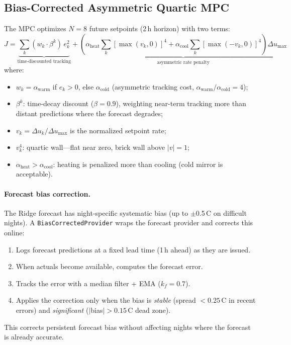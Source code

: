\documentclass[11pt]{article}
\begin{document}
\subsection{Bias-Corrected Asymmetric Quartic MPC}

The MPC optimizes $N = 8$ future setpoints (2\,h horizon) with two terms:
\begin{equation}
  J = \underbrace{\sum_{k} (w_k \cdot \beta^k) \, e_k^2}_{\text{time-discounted tracking}}
    + \underbrace{\left( \alpha_\mathrm{heat} \sum_{k} [\max(v_k, 0)]^4
           + \alpha_\mathrm{cool} \sum_{k} [\max(-v_k, 0)]^4 \right) \Delta u_\mathrm{max}}_{\text{asymmetric rate penalty}}
\end{equation}
where:
\begin{itemize}
  \item $w_k = \alpha_\mathrm{warm}$ if $e_k > 0$, else $\alpha_\mathrm{cold}$
    (asymmetric tracking cost, $\alpha_\mathrm{warm}/\alpha_\mathrm{cold} = 4$);
  \item $\beta^k$: time-decay discount ($\beta = 0.9$), weighting near-term
    tracking more than distant predictions where the forecast degrades;
  \item $v_k = \Delta u_k / \Delta u_\mathrm{max}$ is the normalized setpoint rate;
  \item $v_k^4$: quartic wall---flat near zero, brick wall above $|v| = 1$;
  \item $\alpha_\mathrm{heat} > \alpha_\mathrm{cool}$: heating is penalized more
    than cooling (cold mirror is acceptable).
\end{itemize}

\paragraph{Forecast bias correction.}
The Ridge forecast has night-specific systematic bias (up to
$\pm$0.5\,\textdegree C on difficult nights).  A \texttt{BiasCorrectedProvider}
wraps the forecast provider and corrects this online:
\begin{enumerate}
  \item Logs forecast predictions at a fixed lead time (1\,h ahead) as they
    are issued.
  \item When actuals become available, computes the forecast error.
  \item Tracks the error with a median filter + EMA ($k_f = 0.7$).
  \item Applies the correction only when the bias is \emph{stable}
    (spread $< 0.25$\,\textdegree C in recent errors) and \emph{significant}
    ($|$bias$| > 0.15$\,\textdegree C dead zone).
\end{enumerate}
This corrects persistent forecast bias without affecting nights where the
forecast is already accurate.
\end{document}
